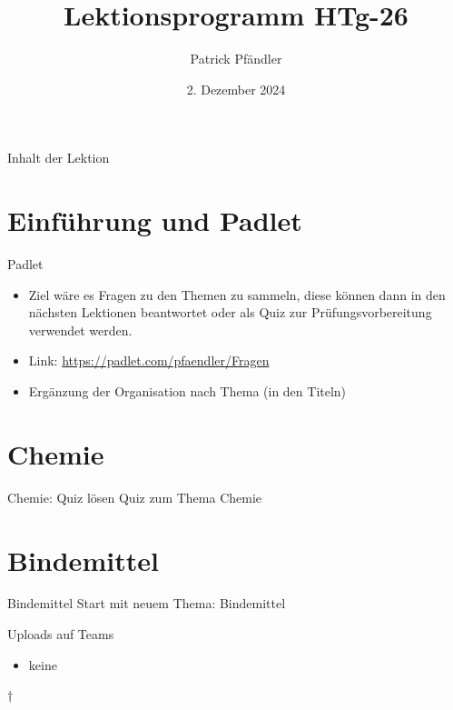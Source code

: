 



\title{\textbf{Lektionsprogramm HTg-26}}
\author{Patrick Pfändler}
\date{2. Dezember 2024}




\frame{\titlepage}

\begin{frame}{Inhalt der Lektion}
    \tableofcontents
\end{frame}


\section{Einführung und Padlet}

\begin{frame}{Padlet}
\begin{itemize}
	\item[\textbullet] Ziel wäre es Fragen zu den Themen zu sammeln, diese können dann in den nächsten Lektionen beantwortet oder als Quiz zur Prüfungsvorbereitung verwendet werden.
	\item[\textbullet] Link: \url{https://padlet.com/pfaendler/Fragen}
	\item[\textbullet] Ergänzung der Organisation nach Thema (in den Titeln)
\end{itemize}
\end{frame}


\section{Chemie}
\begin{frame}{Chemie: Quiz lösen}
    Quiz zum Thema Chemie
\end{frame}



\section{Bindemittel}
\begin{frame}{Bindemittel}
    Start mit neuem Thema: Bindemittel
\end{frame}




\begin{frame}{Uploads auf Teams}
    \begin{itemize}
        \item [\textbullet] keine

    \end{itemize}
\end{frame}


\folieFragen†

